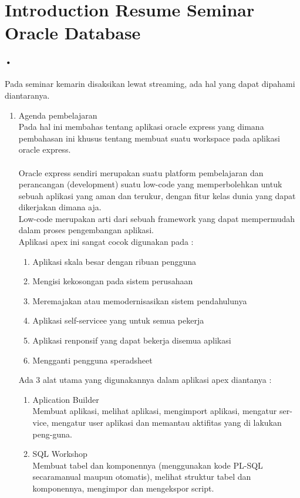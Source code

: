 \section*{Introduction Resume Seminar Oracle Database}
\paragraph{•} Pada seminar kemarin disaksikan lewat streaming, ada hal yang dapat dipahami diantaranya.
\begin{enumerate}
\item
Agenda pembelajaran \\
Pada hal ini membahas tentang aplikasi oracle express yang dimana pembahasan ini khusus tentang membuat suatu workspace pada aplikasi oracle express. \\ \\ Oracle express sendiri merupakan suatu platform pembelajaran dan perancangan (development) suatu low-code yang memperbolehkan untuk sebuah aplikasi yang aman dan terukur, dengan fitur kelas dunia yang dapat dikerjakan dimana aja. \\ 
Low-code merupakan arti dari sebuah framework yang dapat mempermudah dalam proses pengembangan aplikasi. \\
Aplikasi apex ini sangat cocok digunakan pada :
\begin{enumerate}
\item Aplikasi skala besar dengan ribuan pengguna
\item Mengisi kekosongan pada sistem perusahaan
\item Meremajakan atau memodernisasikan sistem pendahulunya
\item Aplikasi self-servicee yang untuk semua pekerja
\item Aplikasi renponsif yang dapat bekerja disemua aplikasi
\item Mengganti pengguna speradsheet
\end{enumerate}
Ada 3 alat utama yang digunakannya dalam aplikasi apex diantanya :
\begin{enumerate}
\item Aplication Builder
\\ Membuat aplikasi, melihat aplikasi, mengimport aplikasi, mengatur ser-vice, mengatur user aplikasi dan memantau aktifitas yang di lakukan peng-guna.
\item SQL Workshop
\\ Membuat tabel dan komponennya (menggunakan kode PL-SQL secaramanual  maupun  otomatis),  melihat  struktur  tabel  dan  komponennya, mengimpor dan mengekspor script.

\end{enumerate}
\end{enumerate}
